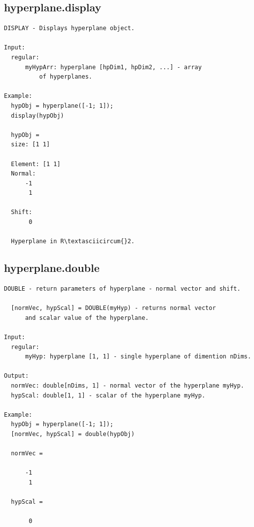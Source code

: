 \documentclass[letterpaper,10pt,english]{sphinxmanual}
\begin{document}
\subsection{hyperplane.display}
\label{chap_functions:hyperplane-display}
\begin{Verbatim}[commandchars=\\\{\}]
DISPLAY - Displays hyperplane object.

Input:
  regular:
      myHypArr: hyperplane [hpDim1, hpDim2, ...] - array
          of hyperplanes.

Example:
  hypObj = hyperplane([-1; 1]);
  display(hypObj)

  hypObj =
  size: [1 1]

  Element: [1 1]
  Normal:
      -1
       1

  Shift:
       0

  Hyperplane in R\textasciicircum{}2.
\end{Verbatim}


\subsection{hyperplane.double}
\label{chap_functions:hyperplane-double}
\begin{Verbatim}[commandchars=\\\{\}]
DOUBLE - return parameters of hyperplane - normal vector and shift.

  [normVec, hypScal] = DOUBLE(myHyp) - returns normal vector
      and scalar value of the hyperplane.

Input:
  regular:
      myHyp: hyperplane [1, 1] - single hyperplane of dimention nDims.

Output:
  normVec: double[nDims, 1] - normal vector of the hyperplane myHyp.
  hypScal: double[1, 1] - scalar of the hyperplane myHyp.

Example:
  hypObj = hyperplane([-1; 1]);
  [normVec, hypScal] = double(hypObj)

  normVec =

      -1
       1

  hypScal =

       0
\end{Verbatim}
\end{document}
